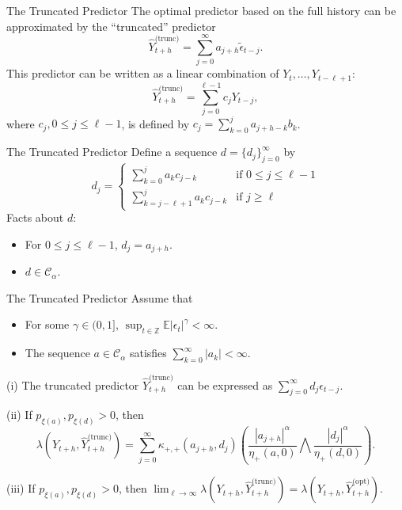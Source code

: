\documentclass{beamer}
\def\E{\mathbb E}
\def\seqSet{\mathcal{C}_{\alpha}}
\def\series{\xi}
\newcommand{\mmultiplier}[4]{\kappa_{#1, #2}(#3, #4)}
\newcommand{\normConst}[3]{\eta_{#1}({#2}, {#3})}
\newcommand{\pred}[1]{\hat{Y}_{t + h}^{\text{(#1)}}}
\begin{document}
\begin{frame}{The Truncated Predictor}
    The optimal predictor based on the full history can be approximated by the ``truncated'' predictor
    \[
    \pred{trunc} = \sum_{j = 0}^{\infty} a_{j + h}\tilde{\epsilon}_{t - j}.
    \]
    This predictor can be written as a linear combination of $Y_t, \ldots, Y_{t - \ell + 1}$:
    \[
    \pred{trunc} = \sum_{j = 0}^{\ell - 1} c_j Y_{t - j},
    \]
    where $c_j, 0 \le j \le \ell - 1$, is defined by $c_j = \sum_{k = 0}^j a_{j + h - k}b_k$.
\end{frame}

\begin{frame}{The Truncated Predictor}
    Define a sequence $d = \{d_j\}_{j = 0}^{\infty}$ by
    \[
    d_j =
    \begin{cases}
        \sum_{k = 0}^j a_k c_{j - k} & \text{if $0 \le j \le \ell - 1$} \\
        \sum_{k = j - \ell + 1}^j a_k c_{j - k} & \text{if $j \ge \ell$}
    \end{cases}
    \]
    Facts about $d$:
    \begin{itemize}
        \item For $0 \le j \le \ell - 1$, $d_j = a_{j + h}$.
        \item $d \in \seqSet$.
    \end{itemize}
\end{frame}

\begin{frame}{The Truncated Predictor}
    Assume that
    \begin{itemize}
        \item For some $\gamma \in (0,1]$, $\sup_{t\in \mathbb Z} \E|\epsilon_t|^\gamma <\infty$.
        \item The sequence $a \in \seqSet$ satisfies $\sum_{k=0}^\infty |a_k| <\infty$.
    \end{itemize}
    \begin{theorem}
        (i) The truncated predictor $\pred{trunc}$ can be expressed as $\sum_{j = 0}^{\infty} d_j\epsilon_{t - j}$.
    
        (ii) If $p_{\series(a)}, p_{\series(d)} > 0$, then
        \[
         \lambda(Y_{t + h}, \pred{trunc}) = \sum_{j = 0}^{\infty} \mmultiplier{+}{+}{a_{j + h}}{d_j}\left(\frac{|a_{j + h}|^{\alpha}}{\normConst{+}{a}{0}} \bigwedge \frac{|d_j|^{\alpha}}{\normConst{+}{d}{0}}\right).
        \]
    
        (iii) If $p_{\series(a)}, p_{\series(d)} > 0$, then $\lim_{\ell \to \infty} \lambda(Y_{t + h}, \pred{trunc}) = \lambda(Y_{t + h}, \pred{opt})$.
    \end{theorem}
\end{frame}
\end{document}
